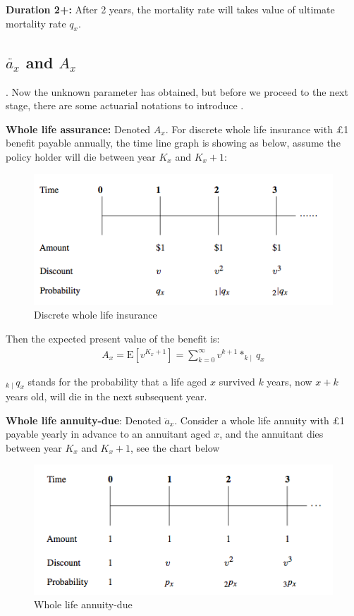 \documentclass{report}
\begin{document}
\textbf{Duration 2+:} After 2 years, the mortality rate will takes value of ultimate mortality rate $q_x$.



\subsection{$\ddot{a_x}$ and $A_x$}. 
Now the unknown parameter has obtained, but before we proceed to the next stage, there are some actuarial notations to introduce \cite{bib:def-for-annuity-assurance}.

\textbf{Whole life assurance:} Denoted $A_x$. For discrete whole life insurance with \pounds1 benefit payable annually, the time line graph is showing as below, assume the policy holder will die between year $K_x$ and $K_x+1$:

\begin{figure}[H]
    \centering
    \includegraphics[width=0.8\linewidth]{fig1.png}
    \caption{Discrete whole life insurance}
\end{figure}






Then the expected present value of the benefit is:
\begin{align}
A_x = \text{E}[v^{K_x+1}] = \sum_{k=0}^{\infty} v^{k+1}*_{k\mid} q_x  \nonumber 
\end{align}

$_{k\mid} q_x$ stands for the probability that a life aged $x$ survived $k$ years, now $x+k$ years old, will die in the next subsequent year.

\textbf{Whole life annuity-due}: Denoted $\ddot{a}_x$. Consider a whole life annuity with \pounds1 payable yearly in advance to an annuitant aged $x$, and the annuitant dies between year $K_x$ and $K_x+1$, see the chart below



\begin{figure}[H]
    \centering
    \includegraphics[width=0.8\linewidth]{fig2.png}
    \caption{Whole life annuity-due}
\end{figure}
\end{document}
